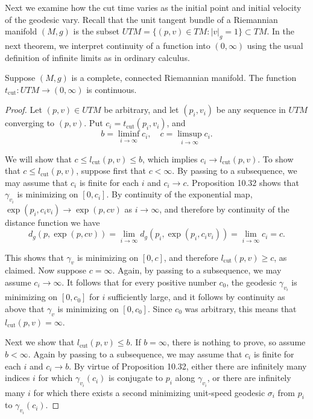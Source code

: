 Next we examine how the cut time varies as the initial point and initial velocity of the geodesic vary. Recall that the unit tangent bundle of a Riemannian manifold $(M,g)$ is the subset $UTM = \{(p,v) \in TM : |v|_g = 1\} \subset TM$. In the next theorem, we interpret continuity of a function into $(0, \infty)$ using the usual definition of infinite limits as in ordinary calculus.

\begin{theorem}
\label{thm:cut-time-continuous}
Suppose $(M,g)$ is a complete, connected Riemannian manifold. The function $t_{\text{cut}}: UTM \to (0,\infty)$ is continuous.

\begin{proof}
Let $(p,v) \in UTM$ be arbitrary, and let $(p_i, v_i)$ be any sequence in $UTM$ converging to $(p,v)$. Put $c_i = t_{\text{cut}}(p_i, v_i)$, and
\[b = \liminf_{i \to \infty} c_i, \quad c = \limsup_{i \to \infty} c_i.\]

We will show that $c \leq l_{\text{cut}}(p,v) \leq b$, which implies $c_i \to l_{\text{cut}}(p,v)$.
To show that $c \leq l_{\text{cut}}(p,v)$, suppose first that $c < \infty$. By passing to a subsequence, we may assume that $c_i$ is finite for each $i$ and $c_i \to c$. Proposition 10.32 shows that $\gamma_{v_i}$ is minimizing on $[0, c_i]$. By continuity of the exponential map, $\exp(p_i, c_i v_i) \to \exp(p, cv)$ as $i \to \infty$, and therefore by continuity of the distance function we have
\[
d_g(p, \exp(p, cv)) = \lim_{i \to \infty} d_g(p_i, \exp(p_i, c_i v_i)) = \lim_{i \to \infty} c_i = c.
\]

This shows that $\gamma_v$ is minimizing on $[0, c]$, and therefore $l_{\text{cut}}(p,v) \geq c$, as claimed. Now suppose $c = \infty$. Again, by passing to a subsequence, we may assume $c_i \to \infty$. It follows that for every positive number $c_0$, the geodesic $\gamma_{v_i}$ is minimizing on $[0, c_0]$ for $i$ sufficiently large, and it follows by continuity as above that $\gamma_v$ is minimizing on $[0, c_0]$. Since $c_0$ was arbitrary, this means that $l_{\text{cut}}(p,v) = \infty$.

Next we show that $l_{\text{cut}}(p,v) \leq b$. If $b = \infty$, there is nothing to prove, so assume $b < \infty$. Again by passing to a subsequence, we may assume that $c_i$ is finite for each $i$ and $c_i \to b$. By virtue of Proposition 10.32, either there are infinitely many indices $i$ for which $\gamma_{v_i}(c_i)$ is conjugate to $p_i$ along $\gamma_{v_i}$, or there are infinitely many $i$ for which there exists a second minimizing unit-speed geodesic $\sigma_i$ from $p_i$ to $\gamma_{v_i}(c_i)$.


\end{proof}
\end{theorem}
